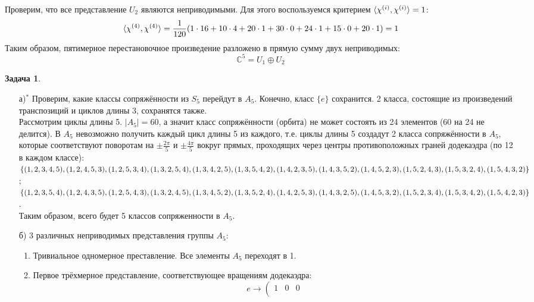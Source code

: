 \documentclass[12pt]{article}
\theoremstyle{definition}
\newtheorem{zad}{Задача}[section]
\begin{document}
Проверим, что все представление $U_2$ являются неприводимыми. Для этого воспользуемся критерием $\braket{\chi^{(i)},\chi^{(i)}}=1$:
\begin{equation}
    \braket{\chi^{(4)},\chi^{(4)}}=\frac{1}{120}(1\cdot16+10\cdot4+20\cdot1+30\cdot0+24\cdot1+15\cdot0+20\cdot1)=1
\end{equation}
Таким образом, пятимерное перестановочное произведение разложено в прямую сумму двух неприводимых:
\begin{equation}
    \boxed{\mathbb{C}^5=U_1\oplus U_2}
\end{equation}
\begin{zad}
\begin{itemize}
    \item[а)$^*$] Проверим, какие классы сопряжённости из $S_5$ перейдут в $A_5$. Конечно, класс $\{e\}$ сохранится. 2 класса, состоящие из произведений транспозиций и циклов длины 3, сохранятся также.\\
    Рассмотрим циклы длины 5. $|A_5|=60$, а значит класс сопряжённости (орбита) не может состоять из 24 элементов (60 на 24 не делится). В $A_5$ невозможно получить каждый цикл длины 5 из каждого, т.е. циклы длины 5 создадут 2 класса сопряжённости в $A_5$, которые соответствуют поворотам на $\pm\frac{2\pi}{5}$ и $\pm\frac{4\pi}{5}$ вокруг прямых, проходящих через центры противоположных граней додекаэдра (по 12 в каждом классе): $\{(1,2,3,4,5), (1,2,4,5,3), (1,2,5,3,4), (1,3,2,5,4), (1,3,4,2,5), (1,3,5,4,2), (1,4,2,3,5),\\ (1,4,3,5,2), (1,4,5,2,3), (1,5,2,4,3), (1,5,3,2,4), (1,5,4,3,2)\}$;\\ $\{(1,2,3,5,4), (1,2,4,3,5), (1,2,5,4,3), (1,3,2,4,5), (1,3,4,5,2), (1,3,5,2,4), (1,4,2,5,3),\\ (1,4,3,2,5), (1,4,5,3,2), (1,5,2,3,4), (1,5,3,4,2), (1,5,4,2,3)\}$.\\
    Таким образом, всего будет 5 классов сопряженности в $A_5$.
    \item[б)] 3 различных неприводимых представления группы $A_5$:
    \begin{enumerate}
        \item Тривиальное одномерное преставление. Все элементы $A_5$ переходят в 1.
        \item Первое трёхмерное представление, соответствующее вращениям додекаэдра:
        \begin{equation*}
        e\rightarrow
        \left(
    \begin{array}{ccc}
    1 & 0 & 0\\

\end{array}
\end{equation*}
\end{enumerate}
\end{itemize}
\end{zad}
\end{document}
